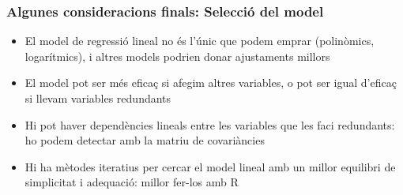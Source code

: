 \documentclass[12pt,t]{beamer}
\theoremstyle{plain}
\theoremstyle{definition}
\begin{document}
\begin{frame}
\frametitle{Algunes consideracions finals: Selecció del model}
\begin{itemize}

\item El model de regressió lineal no és l'únic que podem emprar (polinòmics, logarítmics), i altres models podrien donar ajustaments millors
\medskip

\item El model pot ser més eficaç si afegim altres variables, o pot ser igual d'eficaç si llevam variables redundants
\medskip

\item Hi pot haver dependències lineals entre les variables que les faci redundants: ho podem detectar amb la matriu de covariàncies
\medskip

\item Hi ha mètodes iteratius per cercar el model lineal amb un millor equilibri de simplicitat i adequació: millor fer-los amb R
\end{itemize}

\end{frame}
\end{document}
